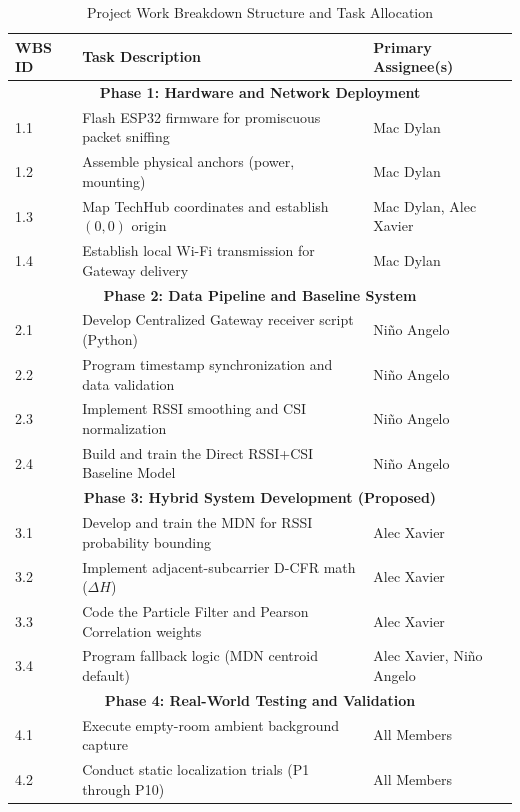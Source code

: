 \begin{table}[htbp]
\caption{Project Work Breakdown Structure and Task Allocation}
\label{tab:wbs}
\centering
\renewcommand{\arraystretch}{1.5} %
\begin{tabular}{|p{}|p{}|p{}|}
\hline
\textbf{WBS ID} & \textbf{Task Description} & \textbf{Primary Assignee(s)} \\
\hline
\multicolumn{3}{|c|}{\textbf{Phase 1: Hardware and Network Deployment}} \\
\hline
1.1 & Flash ESP32 firmware for promiscuous packet sniffing & Mac Dylan \\
\hline
1.2 & Assemble physical anchors (power, mounting) & Mac Dylan \\
\hline
1.3 & Map TechHub coordinates and establish $(0,0)$ origin & Mac Dylan, Alec Xavier \\
\hline
1.4 & Establish local Wi-Fi transmission for Gateway delivery & Mac Dylan \\
\hline
\multicolumn{3}{|c|}{\textbf{Phase 2: Data Pipeline and Baseline System}} \\
\hline
2.1 & Develop Centralized Gateway receiver script (Python) & Niño Angelo \\
\hline
2.2 & Program timestamp synchronization and data validation & Niño Angelo \\
\hline
2.3 & Implement RSSI smoothing and CSI normalization & Niño Angelo \\
\hline
2.4 & Build and train the Direct RSSI+CSI Baseline Model & Niño Angelo \\
\hline
\multicolumn{3}{|c|}{\textbf{Phase 3: Hybrid System Development (Proposed)}} \\
\hline
3.1 & Develop and train the MDN for RSSI probability bounding & Alec Xavier \\
\hline
3.2 & Implement adjacent-subcarrier D-CFR math ($\Delta H$) & Alec Xavier \\
\hline
3.3 & Code the Particle Filter and Pearson Correlation weights & Alec Xavier \\
\hline
3.4 & Program fallback logic (MDN centroid default) & Alec Xavier, Niño Angelo \\
\hline
\multicolumn{3}{|c|}{\textbf{Phase 4: Real-World Testing and Validation}} \\
\hline
4.1 & Execute empty-room ambient background capture & All Members \\
\hline
4.2 & Conduct static localization trials (P1 through P10) & All Members \\

\end{tabular}
\end{table}
